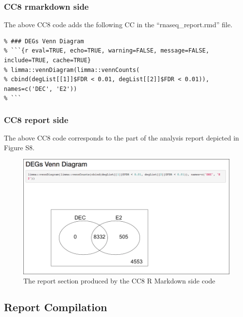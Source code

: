 \documentclass[]{article}
\begin{document}
\hypertarget{cc8-rmarkdown-side}{%
\subsubsection{CC8 rmarkdown side}\label{cc8-rmarkdown-side}}

The above CC8 code adds the following CC in the ``rnaseq\_report.rmd''
file.

\begin{verbatim}
% ### DEGs Venn Diagram
% ```{r eval=TRUE, echo=TRUE, warning=FALSE, message=FALSE, include=TRUE, cache=TRUE}
% limma::vennDiagram(limma::vennCounts(
% cbind(degList[[1]]$FDR < 0.01, degList[[2]]$FDR < 0.01)), names=c('DEC', 'E2'))
% ```
\end{verbatim}

\hypertarget{cc8-report-side}{%
\subsubsection{CC8 report side}\label{cc8-report-side}}

The above CC8 code corresponds to the part of the analysis report
depicted in Figure S8.

\begin{figure}[ht]

{\centering \includegraphics[width=0.95\linewidth]{imgs/8} 

}

\caption{The report section produced by the CC8 R Markdown side code}\label{fig:unnamed-chunk-18}
\end{figure}

\hypertarget{report-compilation}{%
\subsection{Report Compilation}\label{report-compilation}}
\end{document}
